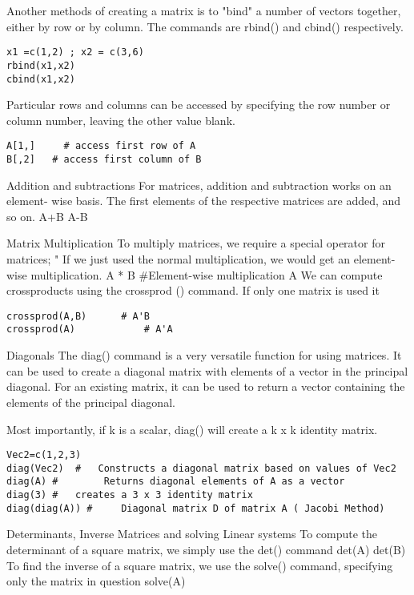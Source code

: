 Another methods of creating a matrix is to "bind" a number of vectors together, either by row or by column. The commands are rbind() and cbind() respectively.
\begin{verbatim}
x1 =c(1,2) ; x2 = c(3,6)
rbind(x1,x2)
cbind(x1,x2)
\end{verbatim}




Particular rows and columns can be accessed by specifying the row number or column number, leaving the other value blank.
\begin{verbatim}
A[1,]	  # access first row of A
B[,2]   # access first column of B
\end{verbatim}
Addition and subtractions
For matrices, addition and subtraction works on an element- wise basis. The first elements of the respective matrices are added, and so on.
A+B
A-B

Matrix Multiplication
To multiply matrices, we require a special operator for matrices; "%
If we just used the normal multiplication, we would get an element-wise multiplication.
A * B  		#Element-wise multiplication
A %
We can compute crossproducts using the crossprod () command. If only one matrix is used it
\begin{framed}
\begin{verbatim}
crossprod(A,B) 		# A'B
crossprod(A) 			# A'A
\end{verbatim}
\end{framed}
Diagonals
The diag() command is a very versatile function for using matrices.
It can be used to create a diagonal matrix with elements of a vector in the principal diagonal. For an existing matrix, it can be used to return a vector containing the elements of the principal diagonal.


Most importantly, if k is a scalar, diag() will create a k x k identity matrix.

\begin{framed}
\begin{verbatim}
Vec2=c(1,2,3)
diag(Vec2)	#	Constructs a diagonal matrix based on values of Vec2
diag(A)	#        Returns diagonal elements of A as a vector
diag(3)	#	creates a 3 x 3 identity matrix
diag(diag(A)) #  	Diagonal matrix D of matrix A ( Jacobi Method)
\end{verbatim}
\end{framed}
Determinants, Inverse Matrices and solving Linear systems
To compute the determinant of a square matrix, we simply use the det() command
det(A)
det(B)
To find the inverse of a square matrix, we use the solve() command, specifying only the matrix in question
solve(A)

